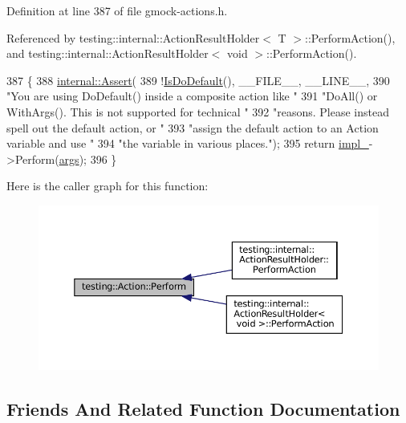 Definition at line 387 of file gmock-\/actions.\+h.



Referenced by testing\+::internal\+::\+Action\+Result\+Holder$<$ T $>$\+::\+Perform\+Action(), and testing\+::internal\+::\+Action\+Result\+Holder$<$ void $>$\+::\+Perform\+Action().


\begin{DoxyCode}
387                                                   \{
388     \hyperlink{namespacetesting_1_1internal_a7a259643b7f2d23ce2b757728df42c99}{internal::Assert}(
389         !\hyperlink{classtesting_1_1Action_a4468ca2ea5e9f7363271145992d09dba}{IsDoDefault}(), \_\_FILE\_\_, \_\_LINE\_\_,
390         \textcolor{stringliteral}{"You are using DoDefault() inside a composite action like "}
391         \textcolor{stringliteral}{"DoAll() or WithArgs().  This is not supported for technical "}
392         \textcolor{stringliteral}{"reasons.  Please instead spell out the default action, or "}
393         \textcolor{stringliteral}{"assign the default action to an Action variable and use "}
394         \textcolor{stringliteral}{"the variable in various places."});
395     \textcolor{keywordflow}{return} \hyperlink{classtesting_1_1Action_a878cb86f5126a22b5c6d5d8fb919f5d9}{impl\_}->Perform(\hyperlink{namespacegenerate__debs_a75f9143e38df82d83b2e8a6f99cae02c}{args});
396   \}
\end{DoxyCode}
Here is the caller graph for this function\+:
\nopagebreak
\begin{figure}[H]
\begin{center}
\leavevmode
\includegraphics[width=350pt]{classtesting_1_1Action_ad00a03062885685da84b308e6e8ff4cb_icgraph}
\end{center}
\end{figure}


\subsection{Friends And Related Function Documentation}
\mbox{\label{classtesting_1_1Action_a66fe4f9c9b9d020273151aa6054b491e}} 
